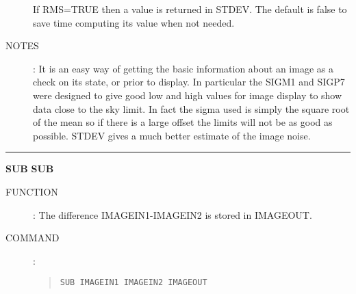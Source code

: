 \begin{description}
\begin{tabbing}
\begin{minipage}[t]{100mm}
If RMS=TRUE then a value is returned in STDEV.
The default is false to save time computing its value when not needed.
\end{minipage}
\end{tabbing}
\item [NOTES]:
It is an easy way of getting the basic information about an image as a check on
its state, or prior to display.
In particular the SIGM1 and SIGP7 were designed to give good low and high values
for image display to show data close to the sky limit.
In fact the sigma used is simply the square root of the mean so if there is a
large offset the limits will not be as good as possible.
STDEV gives a much  better estimate of the image noise.
\end{description}

\goodbreak
\rule{\textwidth}{0.3mm}
{\Large {\bf SUB} \hfill {\bf SUB}}
\begin{description}
\item [FUNCTION]:
The difference IMAGEIN1-IMAGEIN2 is stored in IMAGEOUT.
\item [COMMAND]:
\begin{quote}
{\tt SUB  IMAGEIN1  IMAGEIN2  IMAGEOUT}
\end{quote}
\end{description}

